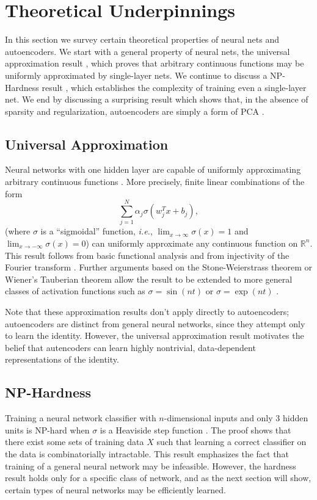 \documentclass[twocolumn]{article}
\newcommand{\R}{\mathbb{R}}
\begin{document}
\section{Theoretical Underpinnings}
In this section we survey certain theoretical properties of neural nets and
autoencoders. We start with a general property of neural nets, the universal
approximation result \cite{cybenko1989approximation}, which proves that
arbitrary continuous functions may be uniformly approximated by single-layer
nets. We continue to discuss a NP-Hardness result \cite{blum1992training}, which
establishes the complexity of training even a single-layer net. We end by
discussing a surprising result which shows that, in the absence of sparsity and
regularization, autoencoders are simply a form of PCA \cite{bourlard1988auto}.

\subsection{Universal Approximation}
Neural networks with one hidden layer are capable of uniformly approximating
arbitrary continuous functions \cite{cybenko1989approximation}. More precisely,
finite linear combinations of the form
\[\sum_{j=1}^N \alpha_j \sigma(w_j^T x + b_j), \]
(where $\sigma$ is a ``sigmoidal'' function, \textit{i.e.}, $\lim_{x \to \infty}
\sigma(x) = 1$ and $\lim_{x \to -\infty} \sigma(x) = 0$) can uniformly
approximate any continuous function on $\R^n$.  This result follows from basic
functional analysis and from injectivity of the Fourier transform
\cite{rudin1991functional}. Further arguments based on the Stone-Weierstrass
theorem or Wiener's Tauberian theorem allow the result to be extended to more
general classes of activation functions such as $\sigma = \sin(nt)$ or $\sigma =
\exp(nt)$ \cite{rudin1991functional}.

Note that these approximation results don't apply directly to autoencoders; 
autoencoders are distinct from general neural networks, since
they attempt only to learn the identity. However, the universal
approximation result motivates the belief that autencoders can learn
highly nontrivial, data-dependent representations of the identity.

\subsection{NP-Hardness}
Training a neural network classifier with $n$-dimensional inputs and only $3$
hidden units is NP-hard when $\sigma$ is a Heaviside step function
\cite{blum1992training}. The proof shows that there exist some sets of training
data $X$ such that learning a correct classifier on the data is combinatorially
intractable. This result emphasizes the fact that training of a
general neural network may be infeasible. However, the hardness result holds
only for a specific class of network, and as the next section will show, certain
types of neural networks may be efficiently learned.
\end{document}
